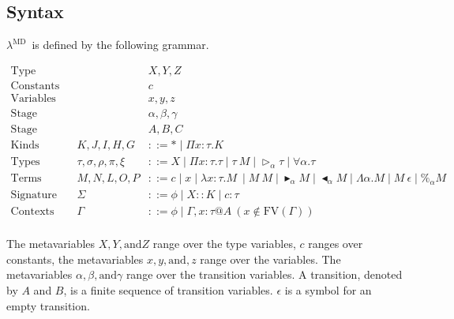 \documentclass[runningheads]{llncs}
\newcommand{\LMD}{$\lambda^{\textrm{MD}}$\ }
\newcommand{\G}{\Gamma}
\newcommand{\TW}{\triangleright}
\newcommand{\F}{\forall}
\newcommand{\TB}{\blacktriangleright}
\newcommand{\TBL}{\blacktriangleleft}
\begin{document}
\subsection{Syntax}

\LMD is defined by the following grammar.

\begin{align*}
    \textrm{Type variables}  &  &                          & X,Y,Z                                                                             \\
    \textrm{Constants}       &  &                          & c                                                                                 \\
    \textrm{Variables}       &  &                          & x,y,z                                                                             \\
    \textrm{Stage variables} &  &                          & \alpha,\beta,\gamma                                                               \\
    \textrm{Stage}           &  &                          & A,B,C                                                                             \\
    \textrm{Kinds}           &  & K,J,I,H,G                & ::= * \mid \Pi x:\tau.K                                                           \\
    \textrm{Types}           &  & \tau,\sigma,\rho,\pi,\xi & ::= X \mid \Pi x:\tau.\tau \mid \tau\ M \mid \TW_{\alpha} \tau \mid \F\alpha.\tau \\
    \textrm{Terms}           &  & M,N,L,O,P                & ::= c \mid x \mid \lambda x:\tau.M\ \mid M\ M \mid \TB_\alpha M 
    \mid \TBL_\alpha M \mid \Lambda\alpha.M \mid M\ \epsilon \mid \%_\alpha M                                                                  \\ 
    \textrm{Signature}       &  & \Sigma                   & ::= \phi \mid X::K \mid c:\tau                                                    \\
    \textrm{Contexts}        &  & \Gamma                   & ::= \phi \mid  \Gamma,x:\tau@A\ (x\not\in\textrm{FV}(\G))                         \\
\end{align*}

The metavariables $X, Y, \text{and} Z$ range over the type variables, $c$ ranges over constants, the metavariables $x, y, \text{and}, z$ range over the variables.
The metavariables $\alpha, \beta, \text{and} \gamma$ range over the transition variables.
A transition, denoted by $A$ and $B$, is a finite sequence of transition variables.
$\epsilon$ is a symbol for an empty transition.
\end{document}
